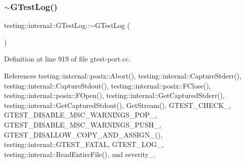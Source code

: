 \subsubsection{\texorpdfstring{$\sim$\+G\+Test\+Log()}{~GTestLog()}}
{\footnotesize\ttfamily testing\+::internal\+::\+G\+Test\+Log\+::$\sim$\+G\+Test\+Log (\begin{DoxyParamCaption}{ }\end{DoxyParamCaption})}



Definition at line 919 of file gtest-\/port.\+cc.



References testing\+::internal\+::posix\+::\+Abort(), testing\+::internal\+::\+Capture\+Stderr(), testing\+::internal\+::\+Capture\+Stdout(), testing\+::internal\+::posix\+::\+F\+Close(), testing\+::internal\+::posix\+::\+F\+Open(), testing\+::internal\+::\+Get\+Captured\+Stderr(), testing\+::internal\+::\+Get\+Captured\+Stdout(), Get\+Stream(), G\+T\+E\+S\+T\+\_\+\+C\+H\+E\+C\+K\+\_\+, G\+T\+E\+S\+T\+\_\+\+D\+I\+S\+A\+B\+L\+E\+\_\+\+M\+S\+C\+\_\+\+W\+A\+R\+N\+I\+N\+G\+S\+\_\+\+P\+O\+P\+\_\+, G\+T\+E\+S\+T\+\_\+\+D\+I\+S\+A\+B\+L\+E\+\_\+\+M\+S\+C\+\_\+\+W\+A\+R\+N\+I\+N\+G\+S\+\_\+\+P\+U\+S\+H\+\_\+, G\+T\+E\+S\+T\+\_\+\+D\+I\+S\+A\+L\+L\+O\+W\+\_\+\+C\+O\+P\+Y\+\_\+\+A\+N\+D\+\_\+\+A\+S\+S\+I\+G\+N\+\_\+(), testing\+::internal\+::\+G\+T\+E\+S\+T\+\_\+\+F\+A\+T\+AL, G\+T\+E\+S\+T\+\_\+\+L\+O\+G\+\_\+, testing\+::internal\+::\+Read\+Entire\+File(), and severity\+\_\+.



